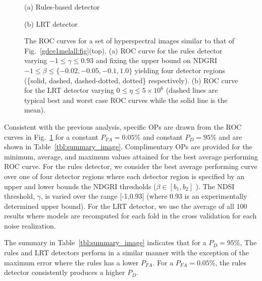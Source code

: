 \documentclass[10pt,journal,cspaper,compsoc]{IEEEtran}
\begin{document}
\begin{figure}
\begin{minipage}[b]{0.48\linewidth}
  \centering
 \centerline{}
  \centerline{(a) Rules-based detector}\medskip
\end{minipage}
\hfill
\begin{minipage}[b]{0.48\linewidth}
  \centering
 \centerline{}
  \centerline{(b) LRT detector}\medskip
\end{minipage}
\vspace{-0.5cm}
\caption{The ROC curves for a set of hyperspectral images similar to that of Fig.~\ref{gdce1melall:fig}(top). 
(a) ROC curve for the rules detector varying $-1 \leq \gamma \leq 0.93$ and fixing 
the upper bound on NDGRI $-1 \leq \beta \leq\{-0.02,-0.05,-0.1,1.0\}$ yielding four detector regions
(\{solid, dashed, dashed-dotted, dotted\} respectively).
(b) ROC curve for the LRT detector varying $ 0 \leq \eta \leq 5\times10^6$
(dashed lines are typical best and worst case ROC curves while the solid line is the mean).}
\label{fig:roc_image}
%
\end{figure}

Consistent with the previous analysis, specific OPs are drawn from the ROC curves in 
Fig.~\ref{fig:roc_image} for a constant $P_{FA}=0.05\%$ and constant $P_D=95\%$ and are shown in Table~\ref{tbl:summary_image}.
Complimentary OPs are provided for the minimum, average, and maximum values attained for the 
best average performing ROC curve.  For the rules detector, we 
consider the best average performing curve over one of four detector regions where each 
detector region is specified by an upper and lower bounds the NDGRI thresholds 
($\beta\in[b_1,b_2]$ ). The NDSI threshold, $\gamma$, is varied over the range [-1,0.93] (where 0.93 is an experimentally determined upper bound).
For the LRT detector, we use the average of all 100 results where models are 
recomputed for each fold in the cross validation for each noise realization.

The summary in Table~\ref{tbl:summary_image} indicates that for a $P_D=95\%$,  
The rules and LRT detectors perform in a similar manner with the exception of the maximum error 
where the rules has a lower $P_{FA}$. For a $P_{FA}=0.05\%$, the rules detector 
consistently produces a higher $P_D$.
\end{document}
